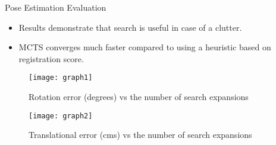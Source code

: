 \begin{columns}[t]
\begin{column}{0.70\textwidth}
	\end{column}
	\begin{column}{0.30\textwidth}
		\begin{block}{\large Pose Estimation Evaluation}
			\centering
			\begin{itemize}
				\item Results demonstrate that search is useful in case of a clutter.
				\item MCTS converges much faster compared to using a heuristic based on registration score.
			\end{itemize}
			\vspace{-0.2in}
			\begin{figure}[h]
				\texttt{[image: graph1]}
				\caption{Rotation error (degrees) vs the number of search expansions}
			\end{figure}
			\begin{figure}[h]
				\texttt{[image: graph2]}
				\caption{Translational error (cms) vs the number of search expansions}
			\end{figure}
		\end{block}
	\end{column}
\end{columns}
